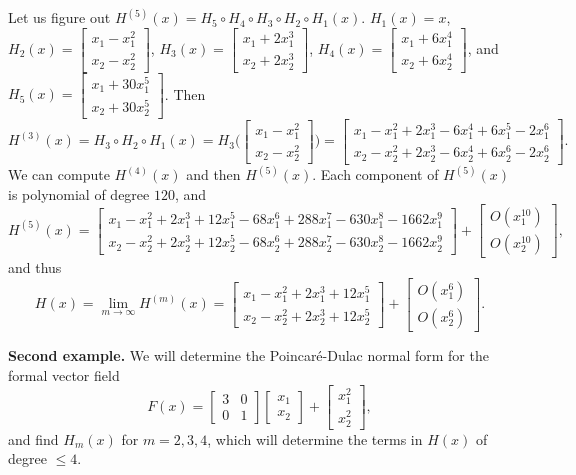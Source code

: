 \documentclass{article}
\begin{document}
Let us figure out $H^{(5)}(x)=H_5\circ H_4 \circ H_3 \circ H_2 \circ H_1 (x)$. $H_1(x)=x$,
$H_2(x)=\begin{bmatrix}x_1-x_1^2\\x_2-x_2^2\end{bmatrix}$,
$H_3(x)=\begin{bmatrix}x_1+2x_1^3\\x_2+2x_2^3\end{bmatrix}$,
$H_4(x)=
\begin{bmatrix}x_1+6x_1^4\\x_2+6x_2^4\end{bmatrix}$,
and $H_5(x)=\begin{bmatrix}x_1+30x_1^5\\x_2+30x_2^5\end{bmatrix}$.
Then
\[
H^{(3)}(x)=H_3 \circ H_2 \circ H_1(x)=H_3\Big(\begin{bmatrix}x_1-x_1^2\\x_2-x_2^2\end{bmatrix}\Big)=
\begin{bmatrix}
x_1-x_1^2+2x_1^3-6x_1^4+6x_1^5-2x_1^6\\
x_2-x_2^2+2x_2^3-6x_2^4+6x_2^6-2x_2^6
\end{bmatrix}.
\]
We can compute $H^{(4)}(x)$ and then $H^{(5)}(x)$. Each component of $H^{(5)}(x)$ is polynomial
of degree $120$, and
\[
H^{(5)}(x)=\begin{bmatrix}
x_1 - x_1^2 + 2 x_1^3 + 12 x_1^5 - 68 x_1^6 + 288 x_1^7 - 630 x_1^8 - 1662 x_1^9\\
x_2 - x_2^2 + 2 x_2^3 + 12 x_2^5 - 68 x_2^6 + 288 x_2^7 - 630 x_2^8 - 1662 x_2^9
\end{bmatrix}
+
\begin{bmatrix}
O(x_1^{10})\\
O(x_2^{10})
\end{bmatrix},
\]
and thus
\[
H(x)=\lim_{m \to \infty} H^{(m)}(x)=
\begin{bmatrix}
x_1 - x_1^2 + 2 x_1^3 + 12 x_1^5\\
x_2 - x_2^2 + 2 x_2^3 + 12 x_2^5
\end{bmatrix}
+
\begin{bmatrix}
O(x_1^6)\\
O(x_2^6)
\end{bmatrix}.
\]

\textbf{Second example.} We will determine the Poincar\'e-Dulac normal form for the formal vector field
\[
F(x)=\begin{bmatrix}3&0\\0&1\end{bmatrix}\begin{bmatrix}x_1\\x_2\end{bmatrix}+\begin{bmatrix}x_1^2\\x_2^2\end{bmatrix},
\]
and find $H_m(x)$ for $m=2,3,4$, which will determine the terms in $H(x)$ of degree $\leq 4$.
\end{document}
